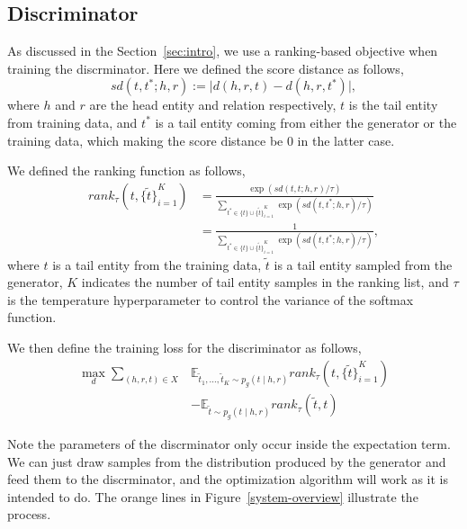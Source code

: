 \documentclass[twocolumn,a4paper,10pt,review,5p]{elsarticle}
\begin{document}
\subsection{Discriminator}

As discussed in the Section~\ref{sec:intro}, we use a ranking-based objective when training the discrminator. Here we defined the score distance as follows,
\[
    sd(t, t^*; h, r) := \lvert d(h, r, t) - d(h, r, t^*) \rvert,
\]
where $h$ and $r$ are the head entity and relation respectively, $t$ is the tail entity from training data, and $t^*$ is a tail entity coming from either the generator or the training data, which making the score distance be 0 in the latter case.

We defined the ranking function as follows,
\begin{align*}
    rank_\tau(t, {\{\tilde t \}}_{i=1}^K)
    &= \frac{\exp(sd(t, t; h, r) / \tau)}
        {\sum_{t^*\in \{t\} \cup {\{\tilde t \}}_{i=1}^K } \exp (sd(t, t^*; h, r) / \tau) } \\
    &= \frac{1}
        {\sum_{t^*\in \{t\} \cup {\{\tilde t \}}_{i=1}^K } \exp (sd(t, t^*; h, r) / \tau) },
\end{align*}
where $t$ is a tail entity from the training data, $\tilde t$ is a tail entity sampled from the generator, $K$ indicates the number of tail entity samples in the ranking list, and $\tau$ is the temperature hyperparameter to control the variance of the softmax function.

We then define the training loss for the discriminator as follows,
\begin{align*}
    \max_d \sum_{(h, r, t)\in X}
        &\mathbb{E}_{\tilde t_1, \dots, \tilde t_K \sim p_g(t \mid h, r)}
            rank_\tau(t, {\{\tilde t \}}_{i=1}^K) \\
        &- \mathbb{E}_{\tilde t \sim p_g(t \mid h, r)}
            rank_\tau(\tilde t, t)
\end{align*}

Note the parameters of the discrminator only occur inside the expectation term. We can just draw samples from the distribution produced by the generator and feed them to the discrminator, and the optimization algorithm will work as it is intended to do. The orange lines in Figure~\ref{system-overview} illustrate the process.
\end{document}
